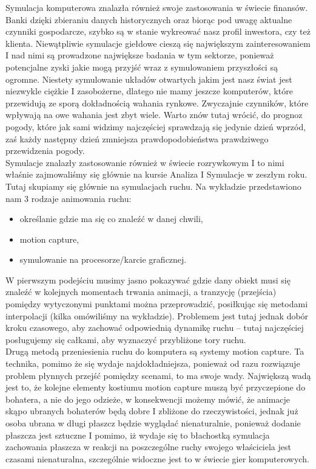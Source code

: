 Symulacja komputerowa znalazła również swoje zastosowania w świecie finansów. Banki dzięki zbieraniu danych historycznych oraz biorąc pod uwagę aktualne czynniki  gospodarcze, szybko są w stanie wykreować nasz profil inwestora, czy też klienta. Niewątpliwie symulacje giełdowe cieszą się największym zainteresowaniem I nad nimi są prowadzone największe badania w tym sektorze, ponieważ potencjalne zyski jakie mogą przyjść wraz z symulowaniem przyszłości są ogromne. Niestety symulowanie układów otwartych jakim jest nasz świat jest niezwykle ciężkie I zasobożerne, dlatego nie mamy jeszcze komputerów, które przewidują ze sporą dokładnością wahania rynkowe. Zwyczajnie czynników, które wpływają na owe wahania jest zbyt wiele. Warto znów tutaj wrócić, do prognoz pogody, które jak sami widzimy najczęściej sprawdzają się jedynie dzień wprzód, zaś każdy następny dzień zmniejsza prawdopodobieństwa prawdziwego przewidzenia pogody. \\

Symulacje znalazły zastosowanie również w świecie rozrywkowym I to nimi właśnie zajmowaliśmy się głównie na kursie Analiza I Symulacje w zeszłym roku. Tutaj skupiamy się głównie na symulacjach ruchu. Na wykładzie przedstawiono nam 3 rodzaje animowania ruchu:

\begin{itemize}
	\item określanie gdzie ma się co znaleźć w danej chwili,
	\item motion capture,
	\item symulowanie na procesorze/karcie graficznej. \\
\end{itemize}

W pierwszym podejściu musimy jasno pokazywać gdzie dany obiekt musi się znaleźć w kolejnych momentach trwania animacji, a tranzycję (przejścia) pomiędzy wytyczonymi punktami można przeprowadzić, posiłkując się metodami interpolacji (kilka omówiliśmy na wykładzie). Problemem jest tutaj jednak dobór kroku czasowego, aby zachować odpowiednią dynamikę ruchu – tutaj najczęściej posługujemy się całkami, aby wyznaczyć przybliżone tory ruchu. \\

Drugą metodą przeniesienia ruchu do komputera są systemy motion capture. Ta technika, pomimo że się wydaje najdokładniejsza, ponieważ od razu rozwiązuje problem płynnych przejść pomiędzy scenami, to ma swoje wady. Największą wadą jest to, że kolejne elementy kostiumu motion capture muszą być przyczepione do bohatera, a nie do jego odzieże, w konsekwencji możemy mówić, że animacje skąpo ubranych bohaterów będą dobre I zbliżone do rzeczywistości, jednak już osoba ubrana w długi płaszcz będzie wyglądać nienaturalnie, ponieważ dodanie płaszcza jest sztuczne I pomimo, iż wydaje się to błachostką symulacja zachowania płaszcza w reakcji na poszczególne ruchy swojego właściciela jest czasami nienaturalna, szczególnie widoczne jest to w świecie gier komputerowych.\\

